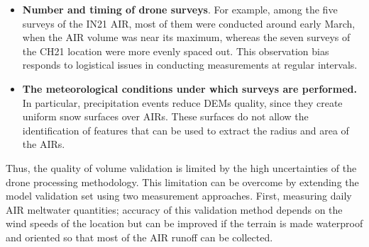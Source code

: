 \begin{itemize}
	\item \textbf{Number and timing of drone surveys}. For example, among the five surveys of the IN21 \ac{AIR}, most of them were
	      conducted around early March, when the \ac{AIR} volume was near its maximum, whereas the seven surveys of the CH21
	      location were more evenly spaced out. This observation bias responds to logistical issues
	      in conducting measurements at regular intervals.

  \item \textbf{The meteorological conditions under which surveys are performed.} In particular, precipitation
    events reduce \ac{DEMs} quality, since they create uniform snow surfaces over \ac{AIRs}. These surfaces do
    not allow the identification of features that can be used to extract the radius and area of the \ac{AIRs}.

\end{itemize}

Thus, the quality of volume validation is limited by the high uncertainties of the drone processing
methodology. This limitation can be overcome by extending the model validation set using two measurement
approaches. First, measuring daily \ac{AIR} meltwater quantities; accuracy of this validation method
depends on the wind speeds of the location but can be improved if the terrain is made waterproof and oriented so
that most of the \ac{AIR} runoff can be collected. 

%
%
%

